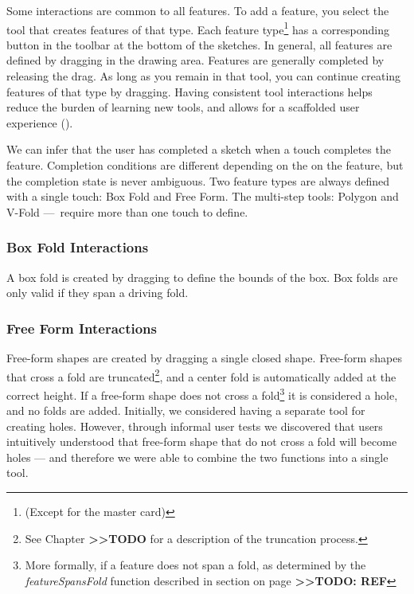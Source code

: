 Some interactions are common to all features. To add a feature, you
select the tool that creates features of that type. Each feature
type\footnote{(Except for the master card)} has a corresponding button
in the toolbar at the bottom of the sketches. In general, all features
are defined by dragging in the drawing area. Features are generally
completed by releasing the drag. As long as you remain in that tool, you
can continue creating features of that type by dragging. Having
consistent tool interactions helps reduce the burden of learning new
tools, and allows for a scaffolded user experience
(\citet{wood2001scaffolding}).

We can infer that the user has completed a sketch when a touch completes
the feature. Completion conditions are different depending on the on the
feature, but the completion state is never ambiguous. Two feature types
are always defined with a single touch: Box Fold and Free Form. The
multi-step tools: Polygon and V-Fold ---~require more than one touch to
define.

\subsubsection{Box Fold Interactions}\label{box-fold-interactions}

A box fold is created by dragging to define the bounds of the box. Box
folds are only valid if they span a driving fold.

\subsubsection{Free Form Interactions}\label{free-form-interactions}

Free-form shapes are created by dragging a single closed shape.
Free-form shapes that cross a fold are truncated\footnote{See Chapter
  \textbf{\textgreater{}\textgreater{}TODO} for a description of the
  truncation process.}, and a center fold is automatically added at the
correct height. If a free-form shape does not cross a fold\footnote{More
  formally, if a feature does not span a fold, as determined by the
  \emph{featureSpansFold} function described in section on page
  \textbf{\textgreater{}\textgreater{}TODO: REF}} it is considered a
hole, and no folds are added. Initially, we considered having a separate
tool for creating holes. However, through informal user tests we
discovered that users intuitively understood that free-form shape that
do not cross a fold will become holes --- and therefore we were able to
combine the two functions into a single tool.

